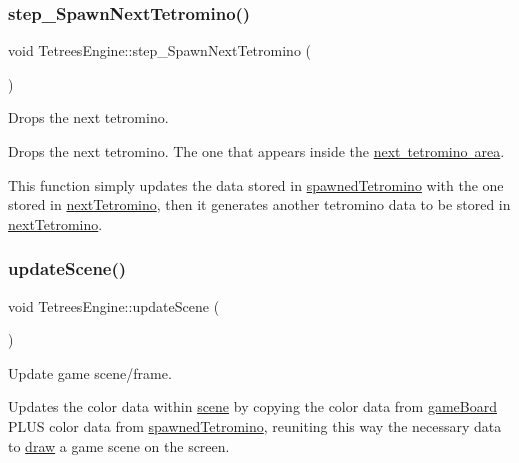 \subsubsection{\texorpdfstring{step\+\_\+\+Spawn\+Next\+Tetromino()}{step\_SpawnNextTetromino()}}
{\footnotesize\ttfamily void Tetrees\+Engine\+::step\+\_\+\+Spawn\+Next\+Tetromino (\begin{DoxyParamCaption}{ }\end{DoxyParamCaption})\hspace{0.3cm}{\ttfamily [private]}}



Drops the next tetromino. 

Drops the next tetromino. The one that appears inside the \mbox{\hyperlink{TetreesUI_8cpp_aac997784ac88b494498d6e08d6fe62d5}{next tetromino area}}.

This function simply updates the data stored in \mbox{\hyperlink{classTetreesEngine_a26435ee2f02d9ba70d9e359745114f6e}{spawned\+Tetromino}} with the one stored in \mbox{\hyperlink{classTetreesEngine_a44c902481f5d8a72ca8a78d24f5c3a33}{next\+Tetromino}}, then it generates another tetromino data to be stored in \mbox{\hyperlink{classTetreesEngine_a44c902481f5d8a72ca8a78d24f5c3a33}{next\+Tetromino}}. \mbox{\label{classTetreesEngine_a9aa3eec9561623f77eab13298ddad13c}} 
\subsubsection{\texorpdfstring{update\+Scene()}{updateScene()}}
{\footnotesize\ttfamily void Tetrees\+Engine\+::update\+Scene (\begin{DoxyParamCaption}{ }\end{DoxyParamCaption})\hspace{0.3cm}{\ttfamily [private]}}



Update game scene/frame. 

Updates the color data within \mbox{\hyperlink{classTetreesEngine_aeade477c0bc2eaaa894ebbdaca93584e}{scene}} by copying the color data from \mbox{\hyperlink{classTetreesEngine_a37d082a7816d6731b2703dd6d1a1cb97}{game\+Board}} P\+L\+US color data from \mbox{\hyperlink{classTetreesEngine_a26435ee2f02d9ba70d9e359745114f6e}{spawned\+Tetromino}}, reuniting this way the necessary data to \mbox{\hyperlink{classTetreesUI_a357ae7240cc5f35b5d61244e7a6bcfe3}{draw}} a game scene on the screen. 


